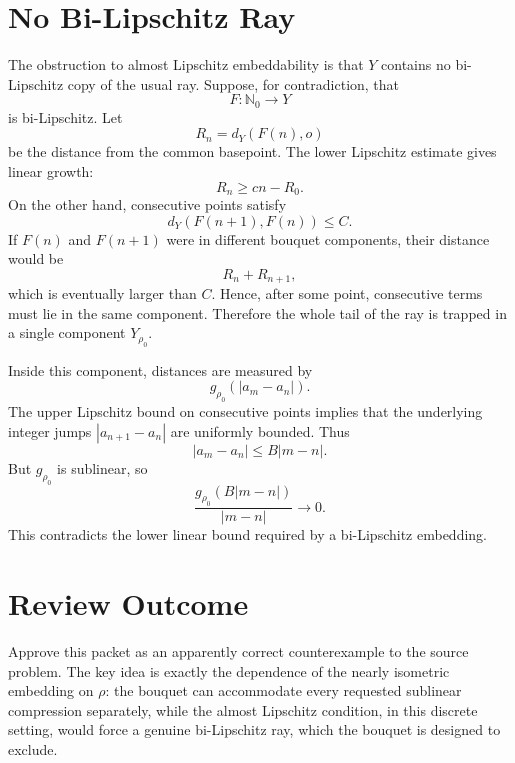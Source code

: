 \documentclass[11pt]{article}
\begin{document}
\section*{No Bi-Lipschitz Ray}

The obstruction to almost Lipschitz embeddability is that \(Y\) contains no
bi-Lipschitz copy of the usual ray.  Suppose, for contradiction, that
\[
  F:\mathbb N_0\to Y
\]
is bi-Lipschitz.  Let
\[
  R_n=d_Y(F(n),o)
\]
be the distance from the common basepoint.  The lower Lipschitz estimate gives
linear growth:
\[
  R_n\geq cn-R_0.
\]
On the other hand, consecutive points satisfy
\[
  d_Y(F(n+1),F(n))\leq C.
\]
If \(F(n)\) and \(F(n+1)\) were in different bouquet components, their
distance would be
\[
  R_n+R_{n+1},
\]
which is eventually larger than \(C\).  Hence, after some point, consecutive
terms must lie in the same component.  Therefore the whole tail of the ray is
trapped in a single component \(Y_{\rho_0}\).

Inside this component, distances are measured by
\[
  g_{\rho_0}(|a_m-a_n|).
\]
The upper Lipschitz bound on consecutive points implies that the underlying
integer jumps \(|a_{n+1}-a_n|\) are uniformly bounded.  Thus
\[
  |a_m-a_n|\leq B|m-n|.
\]
But \(g_{\rho_0}\) is sublinear, so
\[
  \frac{g_{\rho_0}(B|m-n|)}{|m-n|}\to0.
\]
This contradicts the lower linear bound required by a bi-Lipschitz embedding.

\section*{Review Outcome}

Approve this packet as an apparently correct counterexample to the source
problem.  The key idea is exactly the dependence of the nearly isometric
embedding on \(\rho\): the bouquet can accommodate every requested sublinear
compression separately, while the almost Lipschitz condition, in this
discrete setting, would force a genuine bi-Lipschitz ray, which the bouquet is
designed to exclude.
\end{document}
